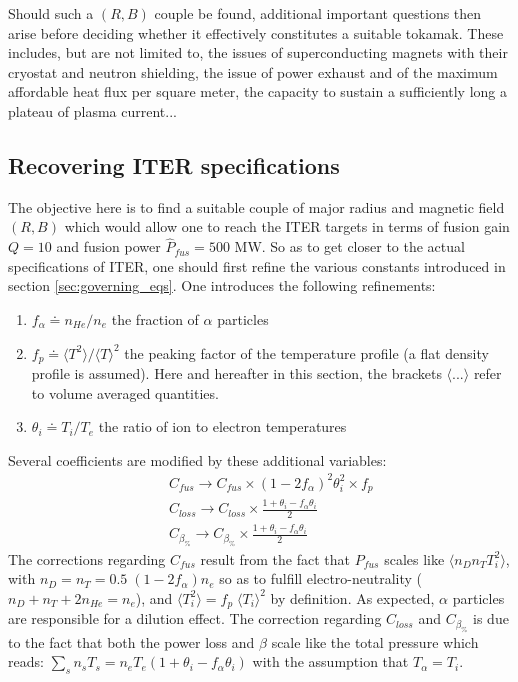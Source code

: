 Should such a $(R, B)$ couple be found, additional important questions then arise before deciding whether it effectively constitutes a suitable tokamak. These includes, but are not limited to, the issues of superconducting magnets with their cryostat and neutron shielding, the issue of power exhaust and of the maximum affordable heat flux per square meter, the capacity to sustain a sufficiently long a plateau of plasma current...

\subsection{Recovering ITER specifications}
\label{sec:ITER_spec}

The objective here is to find a suitable couple of major radius and magnetic field $(R,B)$ which would allow one to reach the ITER targets in terms of fusion gain $Q=10$ and fusion power $\hat P_{fus}=500$ MW.
So as to get closer to the actual specifications of ITER, one should first refine the various constants introduced in section \ref{sec:governing_eqs}. One introduces the following refinements:
\begin{enumerate}
	\item $f_\alpha \doteq n_{He}/n_e$ the fraction of $\alpha$ particles
	\item $f_p \doteq \langle T^2 \rangle / \langle T \rangle^2$ the peaking factor of the temperature profile (a flat density profile is assumed). Here and hereafter in this section, the brackets $\langle ...\rangle$ refer to volume averaged quantities.
	\item $\theta_i \doteq T_i/T_e$ the ratio of ion to electron temperatures
\end{enumerate}
Several coefficients are modified by these additional variables:
\begin{eqnarray*}
	&& C_{fus} \to C_{fus} \times (1-2f_\alpha)^2\theta_i^2 \times f_p \\
	&& C_{loss} \to C_{loss} \times \frac{1+\theta_i - f_\alpha\theta_i}{2}  \\
	&& C_{\beta_\%} \to C_{\beta_\%} \times \frac{1+\theta_i - f_\alpha\theta_i}{2}
\end{eqnarray*}
The corrections regarding $C_{fus}$ result from the fact that $P_{fus}$ scales like $\langle n_Dn_TT_i^2 \rangle$, with $n_D = n_T = 0.5\; (1-2f_\alpha)n_e$ so as to fulfill electro-neutrality ($n_D+n_T+2n_{He}=n_e$), and $\langle T_i^2 \rangle = f_p\; \langle T_i \rangle^2$ by definition. As expected, $\alpha$ particles are responsible for a dilution effect. The correction regarding $C_{loss}$ and $C_{\beta_\%}$ is due to the fact that both the power loss and $\beta$ scale like the total pressure which reads: $\sum_s n_sT_s = n_eT_e (1+\theta_i- f_\alpha \theta_i)$ with the assumption that $T_\alpha=T_i$.
